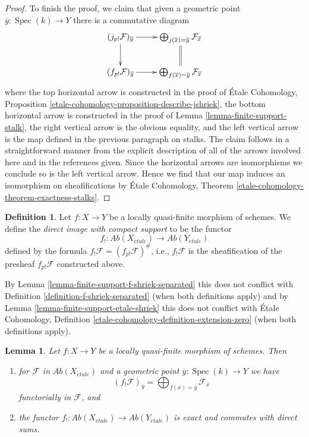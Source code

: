 \documentclass{stacks-project}
\theoremstyle{plain}
\newtheorem{lemma}[subsection]{Lemma}
\theoremstyle{definition}
\newtheorem{definition}[subsection]{Definition}
\theoremstyle{remark}
\numberwithin{equation}{subsection}
\def\Spec{\mathop{\mathrm{Spec}}}
\def\etale{{\acute{e}tale}}
\begin{document}
\begin{proof}
\medskip\noindent
To finish the proof, we claim that given a geometric point
$\overline{y} : \Spec(k) \to Y$ there is a commutative diagram
$$
\xymatrix{
(j_{p!}\mathcal{F})_{\overline{y}} \ar[r] \ar[d] &
\bigoplus_{j(\overline{x}) = \overline{y}} \mathcal{F}_{\overline{x}}
\ar@{=}[d] \\
(f_{p!}\mathcal{F})_{\overline{y}} \ar[r] &
\bigoplus_{f(\overline{x}) = \overline{y}} \mathcal{F}_{\overline{x}}
}
$$
where the top horizontal arrow is constructed in the proof of
\'Etale Cohomology, Proposition
\ref{etale-cohomology-proposition-describe-jshriek},
the bottom horizontal arrow is constructed in the proof of
Lemma \ref{lemma-finite-support-stalk},
the right vertical arrow is the obvious equality, and
the left vertical arrow is the map defined in the previous
paragraph on stalks. The claim follows in a straightforward manner
from the explicit description of all of the arrows involved
here and in the references given.
Since the horizontal arrows are isomorphisms
we conclude so is the left vertical arrow. Hence we find that
our map induces an isomorphism on sheafifications by
\'Etale Cohomology, Theorem \ref{etale-cohomology-theorem-exactness-stalks}.
\end{proof}

\begin{definition}
\label{definition-f-shriek-lqf}
Let $f : X \to Y$ be a locally quasi-finite morphism of schemes.
We define the {\it direct image with compact support} to be the
functor
$$
f_! : \textit{Ab}(X_\etale) \longrightarrow \textit{Ab}(Y_\etale)
$$
defined by the formula $f_!\mathcal{F} = (f_{p!}\mathcal{F})^\#$,
i.e., $f_!\mathcal{F}$ is the sheafification of the presheaf
$f_{p!}\mathcal{F}$ constructed above.
\end{definition}

\noindent
By Lemma \ref{lemma-finite-support-f-shriek-separated}
this does not conflict with Definition \ref{definition-f-shriek-separated}
(when both definitions apply) and by
Lemma \ref{lemma-finite-support-etale-shriek}
this does not conflict with
\'Etale Cohomology, Definition \ref{etale-cohomology-definition-extension-zero}
(when both definitions apply).

\begin{lemma}
\label{lemma-lqf-f-shriek-stalk}
Let $f : X \to Y$ be a locally quasi-finite morphism of schemes. Then
\begin{enumerate}
\item for $\mathcal{F}$ in $\textit{Ab}(X_\etale)$ and a geometric
point $\overline{y} : \Spec(k) \to Y$ we have
$$
(f_!\mathcal{F})_{\overline{y}} =
\bigoplus\nolimits_{f(\overline{x}) = \overline{y}} \mathcal{F}_{\overline{x}}
$$
functorially in $\mathcal{F}$, and
\item the functor $f_! : \textit{Ab}(X_\etale) \to \textit{Ab}(Y_\etale)$
is exact and commutes with direct sums.
\end{enumerate}
\end{lemma}
\end{document}
